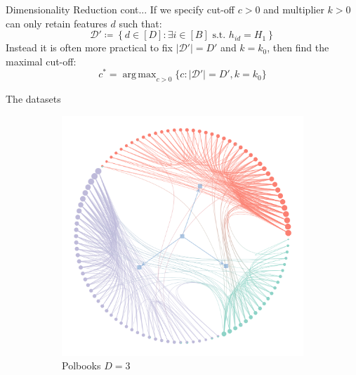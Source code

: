 \documentclass{beamer}
\newcommand{\Dcal}{\mathcal{D}}
\DeclareMathOperator*{\argmax}{arg\,max} %
\begin{document}
	\begin{frame}{Dimensionality Reduction cont...}
		If we specify cut-off $c>0$ and multiplier $k>0$ can only retain features $d$ such that:
		$$\Dcal' \coloneqq \left\{ d \in [D] : \exists i \in [B] \textrm{ s.t. } h_{id} = H_1\right\}$$
		Instead it is often more practical to fix $|\Dcal'| = D'$ and $k=k_0$, then find the maximal cut-off:
		$$c^* = \argmax_{c>0}\{c: |\Dcal'|=D', k=k_0\}$$
	\end{frame}

	\begin{frame}{The datasets}
		\begin{figure}[!h]
			\centering
			\begin{subfigure}[t]{0.3\linewidth}
				\centering
				\includegraphics[width=\linewidth]{polbooks-graph.png}
				\caption{Polbooks $D=3$}
				\label{fig:polbooks-graph}
			\end{subfigure}
			\hfill
			\begin{subfigure}[t]{0.3\linewidth}
				\centering

\end{subfigure}
\end{figure}
\end{frame}
\end{document}
